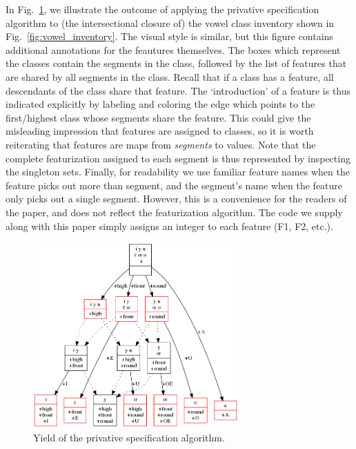 \documentclass[11pt, oneside]{article}   	%
\begin{document}
\vspace{\baselineskip} In Fig.~\ref{fig:privative}, we illustrate the outcome of applying the privative specification algorithm to (the intersectional closure of) the vowel class inventory shown in Fig.~\ref{fig:vowel_inventory}. The visual style is similar, but this figure contains additional annotations for the feautures themselves. The boxes which represent the classes contain the segments in the class, followed by the list of features that are shared by all segments in the class. Recall that if a class has a feature, all descendants of the class share that feature. The `introduction' of a feature is thus indicated explicitly by labeling and coloring the edge which points to the first/highest class whose segments share the feature. This could give the misleading impression that features are assigned to classes, so it is worth reiterating that features are maps from \textit{segments} to values. Note that the complete featurization assigned to each segment is thus represented by inspecting the singleton sets. Finally, for readability we use familiar feature names when the feature picks out more than segment, and the segment's name when the feature only picks out a single segment. However, this is a convenience for the readers of the paper, and does not reflect the featurization algorithm. The code we supply along with this paper simply assigns an integer to each feature (F1, F2, etc.). 

\begin{figure}[htb!]
  \centering
  \includegraphics[width=0.7\textwidth]{vowel_inventory_privative.png}
  \caption{Yield of the privative specification algorithm.}
  \label{fig:privative}
\end{figure}
\end{document}
